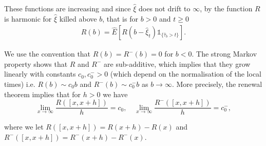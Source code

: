 \documentclass[12pt]{article}
\numberwithin{equation}{section}
\theoremstyle{plain}
\theoremstyle{definition}
\begin{document}
\noindent These functions are increasing and since $\hat{\xi}$ does not drift to $\infty$, by \cite[Lemma 1]{ChaumontLoïc2005OLpc} the function $R$ is harmonic for $\hat{\xi}$ killed above $b$, that is for $b > 0$ and $t\geq 0$
\begin{align}\label{eq: renewal martingale}
R(b) = \hat{E}[R(b-\hat{\xi}_t)\mathds{1}_{\{\hat{\tau}_b>t\}}].
\end{align}

\noindent We use the convention that $R(b) = R^-(b) = 0$ for $b<0$. The strong Markov property shows that $R$ and $R^-$ are sub-additive, which implies that they grow linearly with constants $c_0, c_0^->0$ (which depend on the normalisation of the local times) i.e. $R(b) \sim c_0 b$ and $R^{-}(b) \sim c_0^- b$ as $b \to \infty$. More precisely, the renewal theorem implies that for $h>0$ we have
\begin{equation}\label{eq: renewal theorem}
\lim_{x\to\infty} \frac{R([x, x+h])}{h} = c_0, \quad \lim_{x\to\infty} \frac{R^-([x, x+h])}{h} = c^-_0,
\end{equation}


\noindent where we let $R([x,x+h])=R(x+h)-R(x)$ and $R^-([x,x+h])=R^-(x+h)-R^-(x)$.
\end{document}
